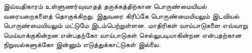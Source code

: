 \documentclass[../../../include/open-logic-chapter]{subfiles}
\begin{document}

\begin{editorial}
  இவ்வதிகாரம் உள்ளுணர்வுவாதத் தருக்கத்திற்கான பொருண்மையியல் வரையறைகளைத்
  தொகுக்கிறது. இதுவரை கிரிப்கே பொருண்மையியலும் இடவியல் பொருண்மையியலும்
  மட்டுமே இடம்பெற்றுள்ளன. மாதிரிகள் வாய்பாடுகளை எவ்வாறு மெய்யாக்குகின்றன
  என்பதற்கோ வாய்பாடுகள் செல்லுபடியாகின்றன என்பதற்கான நிறுவல்களுக்கோ இன்னும்
  எடுத்துக்காட்டுகள் இல்லை.
\end{editorial}


\OLEndChapterHook
\end{document}
